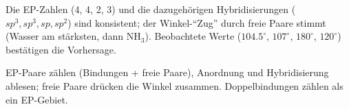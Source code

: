 \begin{kontrolle}
Die EP-Zahlen (4, 4, 2, 3) und die dazugehörigen Hybridisierungen
($sp^3, sp^3, sp, sp^2$) sind konsistent; der Winkel-``Zug'' durch freie Paare
stimmt (Wasser am stärksten, dann NH$_3$). Beobachtete Werte ($104.5^\circ$,
$107^\circ$, $180^\circ$, $120^\circ$) bestätigen die Vorhersage.
\end{kontrolle}

\begin{merksatz}
EP-Paare zählen (Bindungen + freie Paare), Anordnung und Hybridisierung
ablesen; freie Paare drücken die Winkel zusammen. Doppelbindungen zählen als ein
EP-Gebiet.
\end{merksatz}

